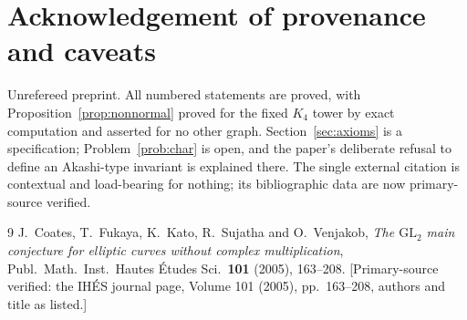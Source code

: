 \documentclass[11pt]{amsart}
\numberwithin{equation}{section}
\theoremstyle{definition}
\theoremstyle{remark}
\begin{document}
\section*{Acknowledgement of provenance and caveats}

Unrefereed preprint. All numbered statements are proved, with
Proposition~\ref{prop:nonnormal} proved for the fixed $K_4$ tower by exact
computation and asserted for no other graph. Section~\ref{sec:axioms} is a
specification; Problem~\ref{prob:char} is open, and the paper's deliberate refusal to
define an Akashi-type invariant is explained there. The single external citation
\cite{CFKSV} is contextual and load-bearing for nothing; its bibliographic data are
now primary-source verified.

\begin{thebibliography}{9}
 J.~Coates, T.~Fukaya, K.~Kato, R.~Sujatha and O.~Venjakob, \emph{The
$\mathrm{GL}_2$ main conjecture for elliptic curves without complex multiplication},
Publ.\ Math.\ Inst.\ Hautes \'Etudes Sci.\ \textbf{101} (2005), 163--208.
[Primary-source verified: the IH\'ES journal page, Volume 101 (2005), pp.~163--208,
authors and title as listed.]
\end{thebibliography}
\end{document}
